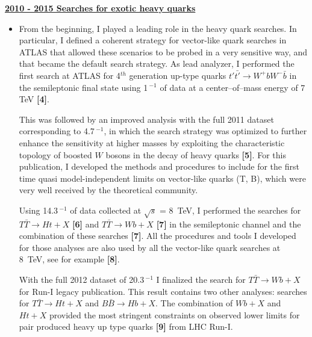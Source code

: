 \documentclass[12pt]{article}
\begin{document}
{\bf \underline{2010 - 2015 Searches for exotic heavy quarks}}
\vskip 0.2cm
\begin{itemize}[leftmargin=1.3cm]
\itemsep0.8em
\item[] From the beginning, I played a leading role in the heavy quark searches. In particular, I defined a coherent strategy for vector-like quark searches in ATLAS that allowed these scenarios to be probed in a very sensitive way, and that became the default search strategy. As lead analyzer, I performed the first search at ATLAS for 4$^{th}$ generation up-type quarks $t'\bar{t'} \rightarrow W^{+}bW^{-}\bar{b}$ in the semileptonic final state using 1\,$^{-1}$ of data at a center--of--mass energy of 7\,TeV {\color{red}\bf[4]}.

\vspace{2.mm}
This was followed by an improved analysis with the full 2011 dataset corresponding to 4.7\,$^{-1}$, in which the search strategy was optimized to further enhance the sensitivity at higher masses by exploiting the characteristic topology of boosted $W$ bosons in the decay of heavy quarks {\color{red}\bf[5]}. 
For this publication, I developed the methods and procedures to include for the first time quasi model-independent limits 
on vector-like quarks (T, B), which were very well received by the theoretical community.


\vspace{2.mm} 
Using 14.3\,$^{-1}$ of data collected at $\sqrt{s}$ = 8~TeV, I performed the searches for $T\bar{T} \rightarrow Ht+X$ {\color{red}\bf[6]} and $T\bar{T} \rightarrow Wb+X$ {\color{red}\bf[7]} in the 
semileptonic channel and the combination of these searches {\color{red}\bf[7]}. All the procedures and tools I developed 
for those analyses are also used by all the vector-like quark searches at 8~TeV, see for example {\color{red}\bf[8]}.
\vspace{2.mm}

With the full 2012 dataset of 20.3\,$^{-1}$ I finalized the search for $T\bar{T} \rightarrow Wb+X$  for Run-I legacy publication.
This result contains two other analyses: searches for $T\bar{T} \rightarrow Ht+X$
and $B\bar{B} \rightarrow Hb+X$. The combination of $Wb+X$ and $Ht+X$ provided the most stringent constraints on observed lower limits for pair produced heavy up type quarks {\color{red}\bf[9]} from LHC Run-I.  

\end{itemize}
\vskip 0.4cm
\end{document}
